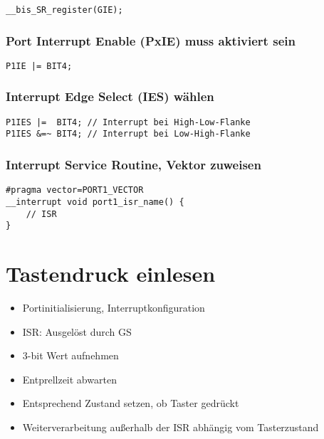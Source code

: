 \documentclass[a4paper, 12pt]{article}
\begin{document}
\begin{lstlisting}
__bis_SR_register(GIE);
\end{lstlisting}

\subsubsection*{ Port Interrupt Enable (PxIE) muss aktiviert sein}
\begin{lstlisting}
P1IE |= BIT4;
\end{lstlisting}

\subsubsection*{Interrupt Edge Select (IES) wählen}
\begin{lstlisting}
P1IES |=  BIT4; // Interrupt bei High-Low-Flanke
P1IES &=~ BIT4; // Interrupt bei Low-High-Flanke
\end{lstlisting}

\subsubsection*{Interrupt Service Routine, Vektor zuweisen}
\begin{lstlisting}
#pragma vector=PORT1_VECTOR
__interrupt void port1_isr_name() {
    // ISR
}
\end{lstlisting}

\section{Tastendruck einlesen}
\begin{itemize}
\item Portinitialisierung, Interruptkonfiguration
\item ISR: Ausgelöst durch GS
\item 3-bit Wert aufnehmen
\item Entprellzeit abwarten
\item Entsprechend Zustand setzen, ob Taster gedrückt
\item Weiterverarbeitung außerhalb der ISR abhängig vom Tasterzustand
\end{itemize}



  
 
\end{document}
